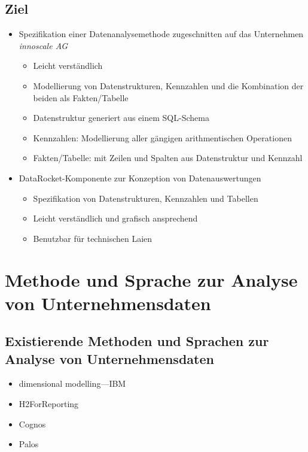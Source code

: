\documentclass[
  language=german, %
  type=bachelor%
]{isthesis}
\begin{document}
\begin{content}
  \section{Ziel}
  \begin{itemize}
    \item Spezifikation einer Datenanalysemethode zugeschnitten auf das
      Unternehmen \textit{innoscale AG}
      \begin{itemize}
        \item Leicht verständlich
        \item Modellierung von Datenstrukturen, Kennzahlen und die Kombination der
          beiden als Fakten/Tabelle
        \item Datenstruktur generiert aus einem SQL-Schema
        \item Kennzahlen: Modellierung aller gängigen arithmentischen Operationen
        \item Fakten/Tabelle: mit Zeilen und Spalten aus Datenstruktur und Kennzahl 
      \end{itemize}
    \item DataRocket-Komponente zur Konzeption von Datenauswertungen
      \begin{itemize}
        \item Spezifikation von Datenstrukturen, Kennzahlen und Tabellen
        \item Leicht verständlich und grafisch ansprechend
        \item Benutzbar für technischen Laien
      \end{itemize}
  \end{itemize}




  \chapter{Methode und Sprache zur Analyse von Unternehmensdaten}

  \section{Existierende Methoden und Sprachen zur Analyse von Unternehmensdaten}
  \begin{itemize}
    \item dimensional modelling---IBM~\cite[][]{ballard1998data}
    \item H2ForReporting
    \item Cognos
    \item Palos
  \end{itemize}


\end{content}
\end{document}
